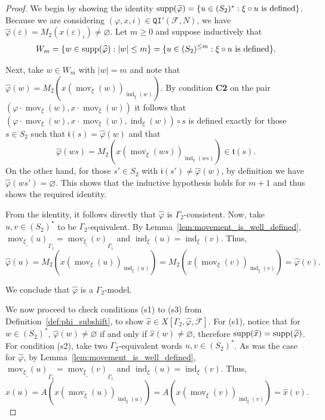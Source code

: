 \documentclass{article}
\theoremstyle{definition}
\theoremstyle{definition}
\newcommand{\Fo}{\mathcal{F}}
\newcommand{\init}{\mathfrak{i}}
\newcommand{\ter}{\mathfrak{t}}
\newcommand{\QI}{\mathtt{QI}}
\newcommand{\mov}{\operatorname{mov}}
\newcommand{\ind}{\operatorname{ind}}
\newcommand{\supp}{\textnormal{supp}}
\begin{document}
\begin{proof}
We begin by showing the identity  $\supp(\widehat{\varphi}) = \{ u\in (S_2)^* : \xi \circ u \mbox{ is defined}\}$. Because we are considering $(\varphi,x,i)\in\QI'(\Fo, N)$, we have $\widehat{\varphi}(\varepsilon) = M_2(x(\varepsilon)_i) \neq \varnothing$. Let $m \geq 0$ and suppose inductively that \[ W_m = \{w \in \supp(\widehat{\varphi}): |w|\leq m\} = \{ u\in (S_2)^{\leq m} : \xi \circ u \mbox{ is defined}\}.  \]



Next, take $w \in W_m$ with $|w|=m$ and note that $\widehat{\varphi}(w) = M_2(x(\mov_{\xi}(w))_{\ind_{\xi}(w)})$. By condition \textbf{C2} on the pair $(\varphi \cdot \mov_{\xi}(w), x \cdot \mov_{\xi}(w))$ it follows that $(\varphi \cdot \mov_{\xi}(w), x \cdot \mov_{\xi}(w), \ind_{\xi}(w))\circ s$ is defined exactly for those $s \in S_2$ such that $\init(s) = \widehat{\varphi}(w)$ and that $$\widehat{\varphi}(ws) = M_2(x(\mov_{\xi}(ws))_{\ind_{\xi}(ws)}) \in \ter(s).$$
On the other hand,  for those $s' \in S_2$ with $\init(s') \neq \widehat{\varphi}(w)$, by definition we have $\widehat{\varphi}(ws') =\varnothing$. This shows that the inductive hypothesis holds for $m+1$ and thus shows the required identity.

From the identity, it follows directly that $\widehat{\varphi}$ is $\Gamma_2$-consistent. Now, take $u,v \in (S_2)^*$ to be $\Gamma_2$-equivalent. By Lemma~\ref{lem:movement_is_well_defined}, $\underline{\mov_{\xi}(u)}_{\Gamma_1} = \underline{\mov_{\xi}(v)}_{\Gamma_1}$ and $\ind_{\xi}(u) = \ind_{\xi}(v)$. Thus,
$$\widehat{\varphi}(u) = M_2(x(\mov_{\xi}(u))_{\ind_{\xi}(u)}) = M_2(x(\mov_{\xi}(v))_{\ind_{\xi}(v)}) = \widehat{\varphi}(v).$$

We conclude that $\widehat{\varphi}$ is a $\Gamma_2$-model.

We now proceed to check conditions (s1) to (s3) from Definition~\ref{def:phi_subshift}, to show $\widehat{x}\in X[\Gamma_2, \widehat{\varphi},\Fo]$. For (s1), notice that for $w\in (S_2)^*$, $\widehat{\varphi}(w)\neq \varnothing$ if and only if $\widehat{x}(w)\neq \varnothing$, therefore $\supp(\widehat{x})=\supp(\widehat{\varphi})$. For condition (s2), take two $\Gamma_2$-equivalent words $u,v\in (S_2)^*$. As was the case for $\widehat{\varphi}$, by Lemma~\ref{lem:movement_is_well_defined}, $\underline{\mov_{\xi}(u)}_{\Gamma_1} = \underline{\mov_{\xi}(v)}_{\Gamma_1}$ and $\ind_{\xi}(u) = \ind_{\xi}(v)$. Thus,
$$\widehat{x}(u) = A(x(\mov_{\xi}(u))_{\ind_{\xi}(u)}) = A(x(\mov_{\xi}(v))_{\ind_{\xi}(v)}) = \widehat{x}(v).$$


\end{proof}
\end{document}

